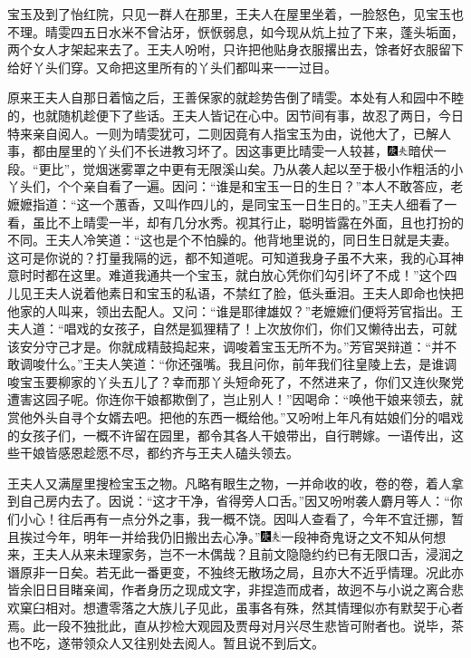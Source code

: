宝玉及到了怡红院，只见一群人在那里，王夫人在屋里坐着，一脸怒色，见宝玉也不理。晴雯四五日水米不曾沾牙，恹恹弱息，如今现从炕上拉了下来，蓬头垢面，两个女人才架起来去了。王夫人吩咐，只许把他贴身衣服撂出去，馀者好衣服留下给好丫头们穿。又命把这里所有的丫头们都叫来一一过目。

原来王夫人自那日着恼之后，王善保家的就趁势告倒了晴雯。本处有人和园中不睦的，也就随机趁便下了些话。王夫人皆记在心中。因节间有事，故忍了两日，今日特来亲自阅人。一则为晴雯犹可，二则因竟有人指宝玉为由，说他大了，已解人事，都由屋里的丫头们不长进教习坏了。因这事更比晴雯一人较甚，{\includegraphics[width=3mm]{../Images/00004}\includegraphics[width=3mm]{../Images/00012}\footnotesize \kaishu 暗伏一段。“更比”，觉烟迷雾罩之中更有无限溪山矣。}乃从袭人起以至于极小作粗活的小丫头们，个个亲自看了一遍。因问：“谁是和宝玉一日的生日？”本人不敢答应，老嬷嬷指道：“这一个蕙香，又叫作四儿的，是同宝玉一日生日的。”王夫人细看了一看，虽比不上晴雯一半，却有几分水秀。视其行止，聪明皆露在外面，且也打扮的不同。王夫人冷笑道：“这也是个不怕臊的。他背地里说的，同日生日就是夫妻。这可是你说的？打量我隔的远，都不知道呢。可知道我身子虽不大来，我的心耳神意时时都在这里。难道我通共一个宝玉，就白放心凭你们勾引坏了不成！”这个四儿见王夫人说着他素日和宝玉的私语，不禁红了脸，低头垂泪。王夫人即命也快把他家的人叫来，领出去配人。又问：“谁是耶律雄奴？”老嬷嬷们便将芳官指出。王夫人道：“唱戏的女孩子，自然是狐狸精了！上次放你们，你们又懒待出去，可就该安分守己才是。你就成精鼓捣起来，调唆着宝玉无所不为。”芳官哭辩道：“并不敢调唆什么。”王夫人笑道：“你还强嘴。我且问你，前年我们往皇陵上去，是谁调唆宝玉要柳家的丫头五儿了？幸而那丫头短命死了，不然进来了，你们又连伙聚党遭害这园子呢。你连你干娘都欺倒了，岂止别人！”因喝命：“唤他干娘来领去，就赏他外头自寻个女婿去吧。把他的东西一概给他。”又吩咐上年凡有姑娘们分的唱戏的女孩子们，一概不许留在园里，都令其各人干娘带出，自行聘嫁。一语传出，这些干娘皆感恩趁愿不尽，都约齐与王夫人磕头领去。

王夫人又满屋里搜检宝玉之物。凡略有眼生之物，一并命收的收，卷的卷，着人拿到自己房内去了。因说：“这才干净，省得旁人口舌。”因又吩咐袭人麝月等人：“你们小心！往后再有一点分外之事，我一概不饶。因叫人查看了，今年不宜迁挪，暂且挨过今年，明年一并给我仍旧搬出去心净。”{\includegraphics[width=3mm]{../Images/00004}\includegraphics[width=3mm]{../Images/00012}\footnotesize \kaishu 一段神奇鬼讶之文不知从何想来，王夫人从来未理家务，岂不一木偶哉？且前文隐隐约约已有无限口舌，浸润之谮原非一日矣。若无此一番更变，不独终无散场之局，且亦大不近乎情理。况此亦皆余旧日目睹亲闻，作者身历之现成文字，非捏造而成者，故迥不与小说之离合悲欢窠臼相对。想遭零落之大族儿子见此，虽事各有殊，然其情理似亦有默契于心者焉。此一段不独批此，直从抄检大观园及贾母对月兴尽生悲皆可附者也。}说毕，茶也不吃，遂带领众人又往别处去阅人。暂且说不到后文。


